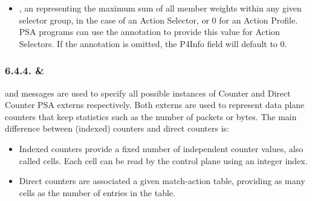 \documentclass[11pt]{article}
\begin{document}
{\begin{itemize}
\item{}
, an  representing the maximum sum of all member
weights within any given selector group, in the case of an Action Selector, or
0 for an Action Profile. PSA programs can use the  annotation
to provide this value for Action Selectors. If the annotation is omitted, the
P4Info field will default to 0.%
\end{itemize}%

\subsubsection{6.4.4.\hspace*{0.5em} \& }\label{sec-counter-directcounter}%

\noindent{} and  messages are used to specify all possible
instances of Counter and Direct Counter PSA externs respectively. Both externs
are used to represent data plane counters that keep statistics such as the
number of packets or bytes. The main difference between (indexed) counters and
direct counters is:%

\begin{itemize}%

\item{}
Indexed counters provide a fixed number of independent counter values, also
called cells. Each cell can be read by the control plane using an integer
index.%

\item{}
Direct counters are associated a given match-action table, providing as many
cells as the number of entries in the table.%
\end{itemize}%

}
\end{document}
